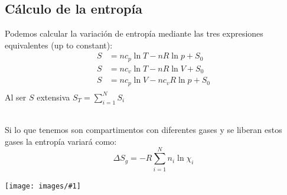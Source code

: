 \documentclass[leqno]{article}
\newcommand{\incimg}[1]{%
    \texttt{[image: images/\#1]}
}
\begin{document}
\subsection{Cálculo de la entropía}
Podemos calcular la variación de entropía mediante las tres expresiones equivalentes (up to constant):
\begin{align*}
  S &= nc_p\ln T - nR\ln p + S_0 \\  
  S &= nc_v\ln T - nR\ln V + S_0 \\  
  S &= nc_p\ln V - nc_vR\ln p + S_0 \\  
\end{align*}
Al ser $S$ extensiva $\displaystyle S_T = \sum_{i=1}^{N} S_i$ \\
\\
\begin{minipage}{0.7\textwidth}
Si lo que tenemos son compartimentos con diferentes gases y se liberan estos gases la entropía variará como:
$$\displaystyle\Delta S_g=-R \sum_{i=1}^{N} n_i\ln\chi_i$$
\end{minipage}
\begin{minipage}{0.25\textwidth}
    \incimg{MezclaGases.png}
\end{minipage}
\end{document}
